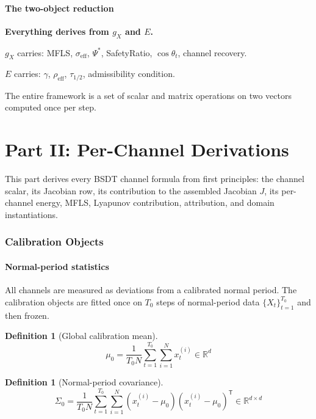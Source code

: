 \documentclass[11pt,a4paper]{article}
\theoremstyle{definition}
\newtheorem{definition}[theorem]{Definition}
\newcommand{\R}{\mathbb{R}}
\newcommand{\T}{^{\mathsf{T}}}
\newcommand{\gX}{g_X}
\begin{document}
\subsection{The two-object reduction}

\textbf{Everything derives from $\gX$ and $E$.}

$\gX$ carries: MFLS, $\sigma_\mathrm{eff}$, $\Psi^*$, SafetyRatio, $\cos\theta_t$, channel recovery.

$E$ carries: $\gamma$, $\rho_\mathrm{eff}$, $\tau_{1/2}$, admissibility condition.

The entire framework is a set of scalar and matrix operations on two vectors computed once per step.

\newpage
\part*{Part II: Per-Channel Derivations}

This part derives every BSDT channel formula from first principles: the channel scalar,
its Jacobian row, its contribution to the assembled Jacobian $J$, its per-channel
energy, MFLS, Lyapunov contribution, attribution, and domain instantiations.

\section{Calibration Objects}

\subsection{Normal-period statistics}

All channels are measured as deviations from a calibrated normal period.
The calibration objects are fitted once on $T_0$ steps of normal-period data
$\{X_t\}_{t=1}^{T_0}$ and then frozen.

\begin{definition}[Global calibration mean]
\[
\mu_0 = \frac{1}{T_0 N}\sum_{t=1}^{T_0}\sum_{i=1}^N x_t^{(i)} \in \R^d
\]
\end{definition}

\begin{definition}[Normal-period covariance]
\[
\Sigma_0 = \frac{1}{T_0 N}\sum_{t=1}^{T_0}\sum_{i=1}^N (x_t^{(i)}-\mu_0)(x_t^{(i)}-\mu_0)\T \in \R^{d\times d}
\]
\end{definition}
\end{document}
